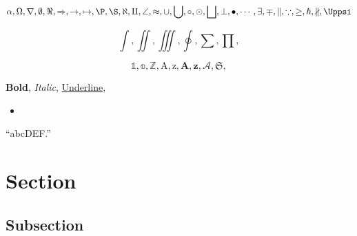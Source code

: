 \documentclass{standalone}
\begin{document}
\[
\alpha, \Omega, \nabla, \emptyset, \Re, \Rightarrow, \to, \mapsto,
\P, \S, \aleph, \amalg, \angle, \approx, \cup, \bigcup, \circ,
\odot, \bigsqcup, \bot, \bullet, \cdots, \exists, \mp, \parallel,
\because, \geq, \hslash, \nparallel, \Uppsi
\]

\[
\int, \iint, \iiint, \oint, \sum, \prod, 
\]

\[
\mathbb{1}, \mathbb{a}, \mathbb{Z}, \mathrm{A}, \mathrm{z}, 
\bm{A}, \bm{z}, \mathscr{A}, \mathfrak{S},
\]

\textbf{Bold}, \textit{Italic}, \underline{Underline},
\begin{itemize}
\item
\end{itemize}
``abcDEF.''

\section{Section}
\subsection{Subsection}
\end{document}
